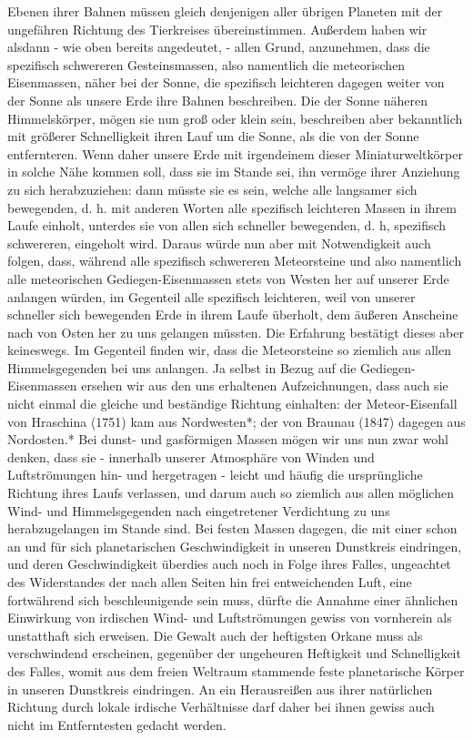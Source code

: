 \documentclass[a4paper, 8pt, oneside, polutonikogreek, german]{article}
\begin{document}
Ebenen ihrer Bahnen müssen gleich denjenigen aller übrigen Planeten mit der ungefähren Richtung des Tierkreises übereinstimmen. Außerdem haben wir alsdann - wie oben bereits angedeutet, - allen Grund, anzunehmen, dass die spezifisch schwereren Gesteinsmassen, also namentlich die meteorischen Eisenmassen, näher bei der Sonne, die spezifisch leichteren dagegen weiter von der Sonne als unsere Erde ihre Bahnen beschreiben. Die der Sonne näheren Himmelskörper, mögen sie nun groß oder klein sein, beschreiben aber bekanntlich mit größerer Schnelligkeit ihren Lauf um die Sonne, als die von der Sonne entfernteren. Wenn daher unsere Erde mit irgendeinem dieser Miniaturweltkörper in solche Nähe kommen soll, dass sie im Stande sei, ihn vermöge ihrer Anziehung zu sich herabzuziehen: dann müsste sie es sein, welche alle langsamer sich bewegenden, d. h. mit anderen Worten alle spezifisch leichteren Massen in ihrem Laufe einholt, unterdes sie von allen sich schneller bewegenden, d. h, spezifisch schwereren, eingeholt wird. Daraus würde nun aber mit Notwendigkeit auch folgen, dass, während alle spezifisch schwereren Meteorsteine und also namentlich alle meteorischen Gediegen-Eisenmassen stets von Westen her auf unserer Erde anlangen würden, im Gegenteil alle spezifisch leichteren, weil von unserer schneller sich bewegenden Erde in ihrem Laufe überholt, dem äußeren Anscheine nach von Osten her zu uns gelangen müssten. Die Erfahrung bestätigt dieses aber keineswegs. Im Gegenteil finden wir, dass die Meteorsteine so ziemlich aus allen Himmelsgegenden bei uns anlangen. Ja selbst in Bezug auf die Gediegen-Eisenmassen ersehen wir aus den uns erhaltenen Aufzeichnungen, dass auch sie nicht einmal die gleiche und beständige Richtung einhalten: der Meteor-Eisenfall von Hraschina (1751) kam aus Nordwesten*; der von Braunau (1847) dagegen aus Nordosten.* Bei dunst- und gasförmigen Massen mögen wir uns nun zwar wohl denken, dass sie - innerhalb unserer Atmosphäre von Winden und Luftströmungen hin- und hergetragen - leicht und häufig die ursprüngliche Richtung ihres Laufs verlassen, und darum auch so ziemlich aus allen möglichen Wind- und Himmelsgegenden nach eingetretener Verdichtung zu uns herabzugelangen im Stande sind. Bei festen Massen dagegen, die mit einer schon an und für sich planetarischen Geschwindigkeit in unseren Dunstkreis eindringen, und deren Geschwindigkeit überdies auch noch in Folge ihres Falles, ungeachtet des Widerstandes der nach allen Seiten hin frei entweichenden Luft, eine fortwährend sich beschleunigende sein muss, dürfte die Annahme einer ähnlichen Einwirkung von irdischen Wind- und Luftströmungen gewiss von vornherein als unstatthaft sich erweisen. Die Gewalt auch der heftigsten Orkane muss als verschwindend erscheinen, gegenüber der ungeheuren Heftigkeit und Schnelligkeit des Falles, womit aus dem freien Weltraum stammende feste planetarische Körper in unseren Dunstkreis eindringen. An ein Herausreißen aus ihrer natürlichen Richtung durch lokale irdische Verhältnisse darf daher bei ihnen gewiss auch nicht im Entferntesten gedacht werden.
\end{document}
